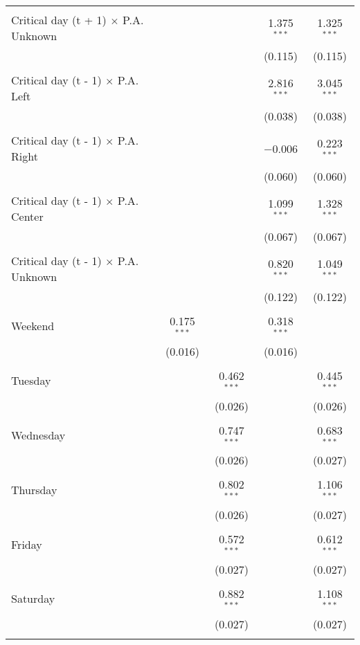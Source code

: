 \documentclass[
]{article}
\begin{document}
\begin{table}[!htbp]
{\begin{tabular}{@{\extracolsep{5pt}}lcccc}
  & & & & \\ 
 Critical day (t + 1) $\times$ P.A. Unknown &  &  & 1.375$^{***}$ & 1.325$^{***}$ \\ 
  &  &  & (0.115) & (0.115) \\ 
  & & & & \\ 
 Critical day (t - 1) $\times$ P.A. Left &  &  & 2.816$^{***}$ & 3.045$^{***}$ \\ 
  &  &  & (0.038) & (0.038) \\ 
  & & & & \\ 
 Critical day (t - 1) $\times$ P.A. Right &  &  & $-$0.006 & 0.223$^{***}$ \\ 
  &  &  & (0.060) & (0.060) \\ 
  & & & & \\ 
 Critical day (t - 1) $\times$ P.A. Center &  &  & 1.099$^{***}$ & 1.328$^{***}$ \\ 
  &  &  & (0.067) & (0.067) \\ 
  & & & & \\ 
 Critical day (t - 1) $\times$ P.A. Unknown &  &  & 0.820$^{***}$ & 1.049$^{***}$ \\ 
  &  &  & (0.122) & (0.122) \\ 
  & & & & \\ 
 Weekend & 0.175$^{***}$ &  & 0.318$^{***}$ &  \\ 
  & (0.016) &  & (0.016) &  \\ 
  & & & & \\ 
 Tuesday &  & 0.462$^{***}$ &  & 0.445$^{***}$ \\ 
  &  & (0.026) &  & (0.026) \\ 
  & & & & \\ 
 Wednesday &  & 0.747$^{***}$ &  & 0.683$^{***}$ \\ 
  &  & (0.026) &  & (0.027) \\ 
  & & & & \\ 
 Thursday &  & 0.802$^{***}$ &  & 1.106$^{***}$ \\ 
  &  & (0.026) &  & (0.027) \\ 
  & & & & \\ 
 Friday &  & 0.572$^{***}$ &  & 0.612$^{***}$ \\ 
  &  & (0.027) &  & (0.027) \\ 
  & & & & \\ 
 Saturday &  & 0.882$^{***}$ &  & 1.108$^{***}$ \\ 
  &  & (0.027) &  & (0.027) \\ 
  & & & & \\ 

\end{tabular}}
\end{table}
\end{document}
